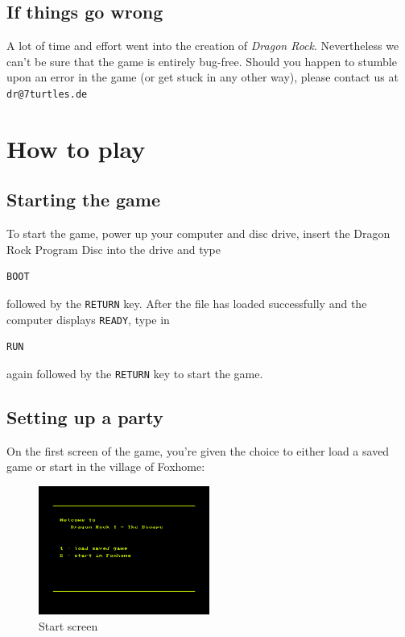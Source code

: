 \documentclass[12pt]{scrbook}
\begin{document}
\section*{If things go wrong}
A lot of time and effort went into the creation of \textit{Dragon Rock}. Nevertheless we can't be sure that the game is entirely bug-free. Should you happen to stumble upon an error in the game (or get stuck in any other way), please contact us at \texttt{dr@7turtles.de}


\chapter{How to play}

\section*{Starting the game}
To start the game, power up your computer and disc drive, insert the Dragon Rock Program Disc into the drive and type
\begin{verbatim}
BOOT
\end{verbatim}
followed by the \texttt{RETURN} key. After the file has loaded successfully and the computer displays \texttt{READY}, type in
\begin{verbatim}
RUN
\end{verbatim}
again followed by the \texttt{RETURN} key to start the game.

\section*{Setting up a party}
On the first screen of the game, you're given the choice to either load a saved game or start in the village of Foxhome:

\begin{figure}[ht]
    \centering
    \includegraphics[width=0.5\textwidth]{startscreen}
    \caption{Start screen}
\end{figure}
\end{document}
